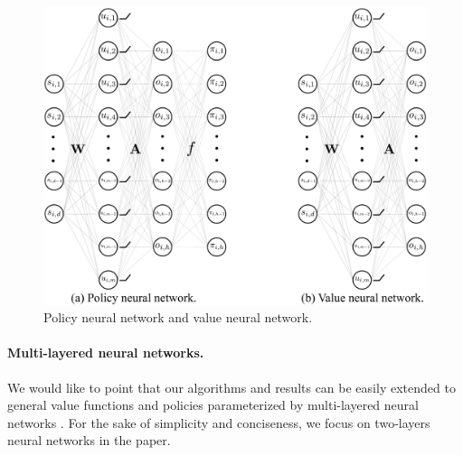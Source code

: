 \begin{figure}[t]
	\begin{center}
		\centerline{\includegraphics[width=0.7\columnwidth]{nn_policy_value_vertical.pdf}}
		\caption{Policy neural network and value neural network.}
		\label{fig:nn_policy_value}
	\end{center}
	\vskip -0.2in
\end{figure}


\paragraph{Multi-layered neural networks.} We would like to point that our algorithms and results can be easily extended to general value functions and policies parameterized by multi-layered neural networks \citep{allen2018convergenceA,allen2018convergenceB,du2018gradientA}. For the sake of simplicity and conciseness, we focus on two-layers neural networks in the paper.



